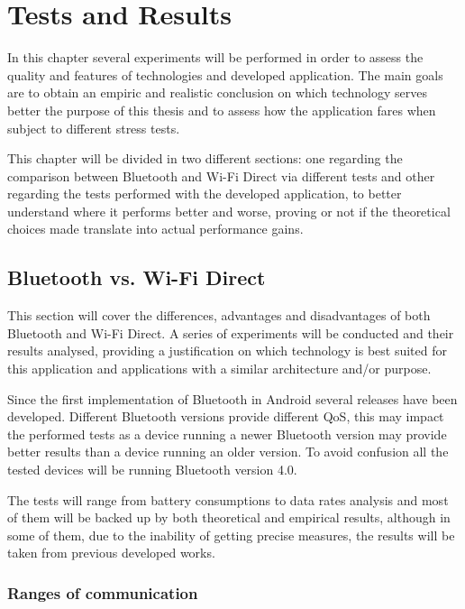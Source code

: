 \chapter{Tests and Results}
\label{tests}

In this chapter several experiments will be performed in order to assess the quality and features of technologies and developed application. The main goals are to obtain an empiric and realistic conclusion on which technology serves better the purpose of this thesis and to assess how the application fares when subject to different stress tests.

This chapter will be divided in two different sections: one regarding the comparison between Bluetooth and Wi-Fi Direct via different tests and other regarding the tests performed with the developed application, to better understand where it performs better and worse, proving or not if the theoretical choices made translate into actual performance gains.

\section{Bluetooth vs. Wi-Fi Direct}

This section will cover the differences, advantages and disadvantages of both Bluetooth and Wi-Fi Direct. A series of experiments will be conducted and their results analysed, providing a justification on which technology is best suited for this application and applications with a similar architecture and/or purpose.

Since the first implementation of Bluetooth in Android several releases have been developed. Different Bluetooth versions provide different \gls{QoS}, this may impact the performed tests as a device running a newer Bluetooth version may provide better results than a device running an older version. To avoid confusion all the tested devices will be running Bluetooth version 4.0.

The tests will range from battery consumptions to data rates analysis and most of them will be backed up by both theoretical and empirical results, although in some of them, due to the inability of getting precise measures, the results will be taken from previous developed works.

\subsection{Ranges of communication}


